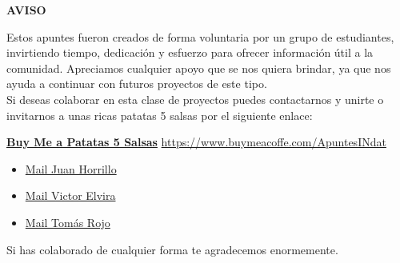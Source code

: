 \vfil

\begin{center}
    \Huge \textbf{AVISO}
\end{center}

Estos apuntes fueron creados de forma voluntaria por un grupo de estudiantes, invirtiendo tiempo, dedicación y esfuerzo para ofrecer información útil a la comunidad. Apreciamos cualquier apoyo que se nos quiera brindar, ya que nos ayuda a continuar con futuros proyectos de este tipo. \\

Si deseas colaborar en esta clase de proyectos puedes contactarnos y unirte o invitarnos a unas ricas patatas 5 salsas por el siguiente enlace:

\vfil

\begin{center}
    \href{https://www.buymeacoffe.com/ApuntesINdat}{\LARGE \textbf{Buy Me a Patatas 5 Salsas}}
    \href{https://www.buymeacoffe.com/ApuntesINdat}{https://www.buymeacoffe.com/ApuntesINdat}
\end{center}

\begin{itemize}
    \item \href{mailto:juan.horrillo22@estudiantes.uva.es}{Mail Juan Horrillo}
    \item \href{mailto:victor.elvira22@estudiantes.uva.es}{Mail Victor Elvira}
    \item \href{mailto:tomas.rojo22@estudiantes.uva.es}{Mail Tomás Rojo}
\end{itemize}

\vfil

Si has colaborado de cualquier forma te agradecemos enormemente.
